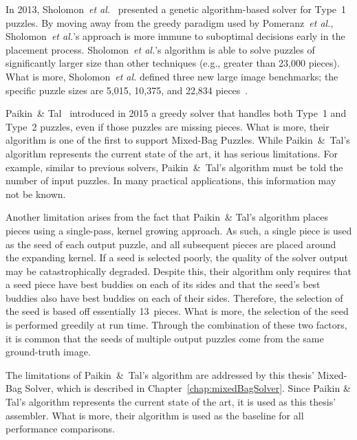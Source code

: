 In 2013, Sholomon~\textit{et al.}~\cite{sholomon2013} presented a genetic algorithm-based solver for Type~1 puzzles.  By moving away from the greedy paradigm used by Pomeranz~\textit{et al.}, Sholomon~\textit{et al.}'s approach is more immune to suboptimal decisions early in the placement process. Sholomon~\textit{et al.}'s algorithm is able to solve puzzles of significantly larger size than other techniques (e.g., greater than 23,000 pieces).  What is more, Sholomon~\textit{et al.} defined three new large image benchmarks; the specific puzzle sizes are 5,015, 10,375, and 22,834 pieces~\cite{sholomonBenchmarkImages}.

Paikin~\& Tal~\cite{paikin2015} introduced in 2015 a greedy solver that handles both Type~1 and Type~2 puzzles, even if those puzzles are missing pieces.  What is more, their algorithm is one of the first to support Mixed-Bag Puzzles.  While Paikin~\&~Tal's algorithm represents the current state of the art, it has serious limitations.  For example, similar to previous solvers, Paikin~\&~Tal's algorithm must be told the number of input puzzles.  In many practical applications, this information may not be known.

Another limitation arises from the fact that Paikin~\& Tal's algorithm places pieces using a single-pass, kernel growing approach.  As such, a single piece is used as the seed of each output puzzle, and all subsequent pieces are placed around the expanding kernel.  If a seed is selected poorly, the quality of the solver output may be catastrophically degraded.  Despite this, their algorithm only requires that a seed piece have best buddies on each of its sides and that the seed's best buddies also have best buddies on each of their sides.  Therefore, the selection of the seed is based off essentially 13~pieces.  What is more, the selection of the seed is performed greedily at run time.  Through the combination of these two factors, it is common that the seeds of multiple output puzzles come from the same ground-truth image.

The limitations of Paikin~\&~Tal's algorithm are addressed by this thesis' Mixed-Bag Solver, which is described in Chapter~\ref{chap:mixedBagSolver}.  Since Paikin \&  Tal's algorithm represents the current state of the art, it is used as this thesis' assembler.  What is more, their algorithm is used as the baseline for all performance comparisons. 